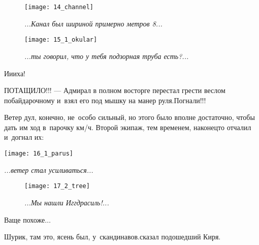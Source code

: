 \begin{figure}[h]
	\centering
	\texttt{[image: 14\_channel]}
	\caption{\small\textit{...Канал был шириной примерно метров 8...}}
\end{figure}

\newpage

\begin{figure}[h]
	\centering
	\texttt{[image: 15\_1\_okular]}
	\caption{\small\textit{...ты говорил, что у тебя подзорная труба есть?...}}
\end{figure}

\newpage

\noindent
\begin{minipage}{0.38\textwidth}
	\setlength{\parindent}{1.0cm}  %
	\setlength{\parskip}{0.25cm}     %
	
	\vspace{-0.4cm}
	\diagdash И\sdash и\sdash иха! 
	
	\diagdash ПОТАЩИЛО!!! --- Адмирал в полном восторге перестал грести веслом по\sdash байдарочному и~взял его под мышку на манер руля.\mdash Погнали!!!
	
	Ветер дул, конечно, не~особо сильный, но этого было вполне достаточно, чтобы дать им ход в~парочку км/ч. Второй экипаж, тем временем, наконец\sdash то отчалил и~догнал их:
\end{minipage}\hfill
\begin{minipage}{0.57\textwidth}
	\centering
	\texttt{[image: 16\_1\_parus]}
	
	{\small\textit{...ветер стал усиливаться...}}
\end{minipage}

\newpage

\begin{wrapfigure}[20]{r}{0.55\textwidth}
	\centering
	\texttt{[image: 17\_2\_tree]}
	\caption{\small\textit{...Мы нашли Иггдрасиль!...}}
\end{wrapfigure}
\diagdash Ваще похоже$\ldots$

\diagdash Шурик, там это, ясень был, у~скандинавов.\mdash сказал подошедший Киря.


